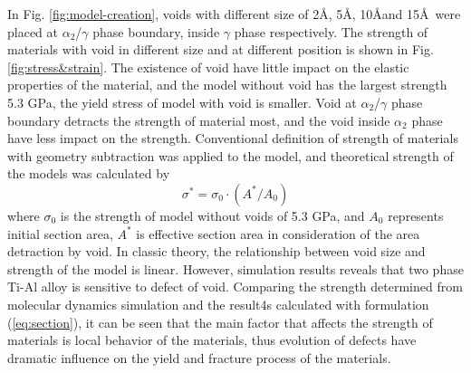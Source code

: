 \documentclass[materials,article,submit,moreauthors,pdftex,10pt,a4paper]{Definitions/mdpi}
\begin{document}
In Fig. \ref{fig:model-creation}, voids with different size of 2\AA, 5\AA, 10\AA and 15\AA\ were placed  at $\alpha_2$/$\gamma$ phase boundary, inside $\gamma$ phase respectively. The strength of materials with void in different size and at different position is shown in Fig.\ref{fig:stress&strain}. The existence of void have little impact on the elastic properties of the material, and the model without void has the largest strength 5.3 GPa, the yield stress of model with void is smaller. Void at $\alpha_2$/$\gamma$ phase boundary  detracts the strength of  material most, and the void inside $\alpha_2$ phase  have less impact on the strength.          
Conventional definition of strength of materials with geometry subtraction was applied to the model, and theoretical strength of the models was calculated by
\begin{equation} \label{eq:section} 
\sigma^* = \sigma_0 \cdot({A^*}/{A_0})
\end{equation}
where $\sigma_0$ is the strength of model without voids of 5.3 GPa, and $A_0$ represents initial section area,  $A^*$ is effective section area in consideration of the area detraction by void.  In classic theory, the relationship between void size and strength of the model is linear. However, simulation results reveals that two phase Ti-Al alloy is sensitive to defect of void.  Comparing the strength determined from molecular dynamics simulation and the result4s calculated with formulation (\ref{eq:section}), it can be seen that the main factor that affects the strength of materials is local behavior of the materials, thus evolution of defects have dramatic influence on the yield and fracture process of the materials.
\end{document}

